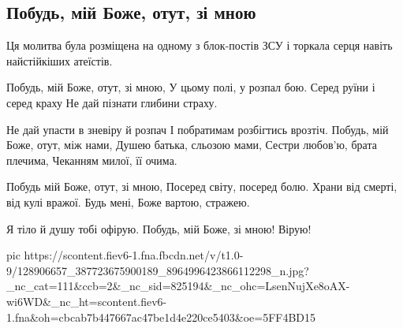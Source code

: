  
 
 
 
 

\subsection{Побудь, мій Боже, отут, зі мною}

Ця молитва була розміщена на одному з блок-постів ЗСУ і торкала серця навіть найстійкіших атеїстів.

\begin{multicols}{2}
	\obeycr
Побудь, мій Боже, отут, зі мною,
У цьому полі, у розпал бою.
Серед руїни і серед краху
Не дай пізнати глибини страху.

Не дай упасти в зневіру й розпач
І побратимам розбігтись врозтіч.
Побудь, мій Боже, отут, між нами,
Душею батька, сльозою мами,
Сестри любов'ю, брата плечима,
Чеканням милої, її очима.

Побудь мій Боже, отут, зі мною,
Посеред світу, посеред болю.
Храни від смерті, від кулі вражої.
Будь мені, Боже вартою, стражею.

Я тіло й душу тобі офірую.
Побудь, мій Боже, зі мною! Вірую!
	\restorecr
\end{multicols}

\ifcmt
pic https://scontent.fiev6-1.fna.fbcdn.net/v/t1.0-9/128906657_387723675900189_8964996423866112298_n.jpg?_nc_cat=111&ccb=2&_nc_sid=825194&_nc_ohc=LsenNujXe8oAX-wi6WD&_nc_ht=scontent.fiev6-1.fna&oh=cbcab7b447667ac47be1d4e220ce5403&oe=5FF4BD15
\fi
